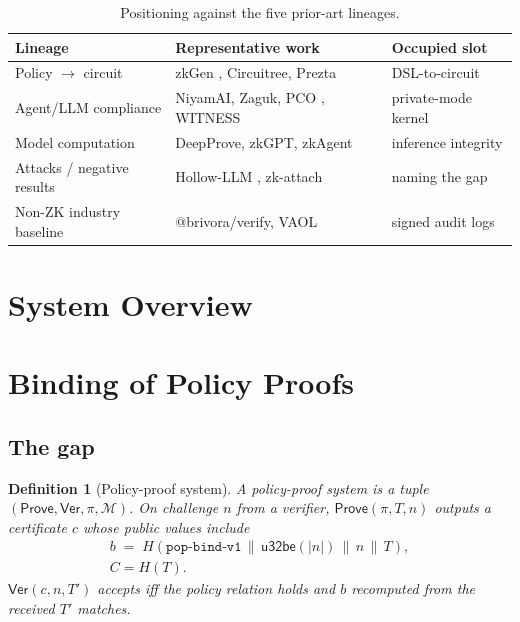 \documentclass[journal]{IEEEtran}
\newtheorem{definition}[theorem]{Definition}
\newcommand{\need}[1]{}
\newcommand{\fixme}[1]{}
\newcommand{\need}[1]{\textcolor{blue}{[[ NEED: #1 ]]}}
\newcommand{\fixme}[1]{\textcolor{orange}{[[ FIX: #1 ]]}}
\begin{document}
\begin{table}[t]
\centering
\caption{Positioning against the five prior-art lineages.}
\label{tab:related}
\setlength{\tabcolsep}{3pt}
\begin{tabular}{@{}L{0.26\columnwidth}L{0.42\columnwidth}L{0.26\columnwidth}@{}}
\toprule
Lineage & Representative work & Occupied slot \\
\midrule
Policy $\to$ circuit      & zkGen \cite{zkgen}, Circuitree, Prezta & DSL-to-circuit \\
Agent/LLM compliance      & NiyamAI, Zaguk, PCO \cite{pco}, WITNESS & private-mode kernel \\
Model computation         & DeepProve, zkGPT, zkAgent \cite{zkagent} & inference integrity \\
Attacks / negative results& Hollow-LLM \cite{hollowllm}, zk-attach \cite{zkattach} & naming the gap \\
Non-ZK industry baseline  & @brivora/verify, VAOL & signed audit logs \\
\bottomrule
\end{tabular}
\end{table}

\fixme{引文纪律：除 Hollow-LLM / zkGen / NiyamAI / zkAgent / ePrint 2024/813
五条外，其余引文必须逐条打开原文核实后再进 bibliography。
见 docs/tdsc-fixlist.md \S2 的注记。}

\section{System Overview}
\label{sec:system}

\need{DSL $\to$ ConstraintSpec $\to$ circuit；双模式；证书 + 锚定；
工具回执链；801 测试 / 15 skip 的工件陈述。}

\section{Binding of Policy Proofs}
\label{sec:binding}

\subsection{The gap}

\begin{definition}[Policy-proof system]
A policy-proof system is a tuple $(\mathsf{Prove}, \mathsf{Ver}, \pi, \mathcal{M})$.
On challenge $n$ from a verifier, $\mathsf{Prove}(\pi, T, n)$ outputs a
certificate $c$ whose public values include
\begin{multline*}
b \;=\; H(\texttt{pop-bind-v1} \,\|\, \mathsf{u32be}(|n|) \,\|\, n \,\|\, T),\\
C = H(T).
\end{multline*}
$\mathsf{Ver}(c, n, T')$ accepts iff the policy relation holds \emph{and}
$b$ recomputed from the received $T'$ matches.
\end{definition}
\end{document}
